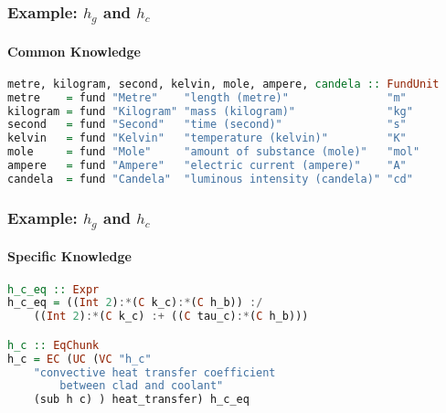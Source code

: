 \documentclass{beamer}
\begin{document}
\begin{frame}[fragile]
\frametitle{Example: $h_g$ and $h_c$}
\framesubtitle{Common Knowledge}


\begin{lstlisting}[language=Haskell, frame=single, showstringspaces=false, basicstyle=\tiny]
metre, kilogram, second, kelvin, mole, ampere, candela :: FundUnit
metre    = fund "Metre"    "length (metre)"               "m"
kilogram = fund "Kilogram" "mass (kilogram)"              "kg"
second   = fund "Second"   "time (second)"                "s"
kelvin   = fund "Kelvin"   "temperature (kelvin)"         "K"
mole     = fund "Mole"     "amount of substance (mole)"   "mol"
ampere   = fund "Ampere"   "electric current (ampere)"    "A"
candela  = fund "Candela"  "luminous intensity (candela)" "cd"
\end{lstlisting}


\end{frame}


\begin{frame}[fragile]

\frametitle{Example: $h_g$ and $h_c$}

\framesubtitle{Specific Knowledge}


\begin{lstlisting}[language=Haskell, frame=single, showstringspaces=false, basicstyle=\small]
h_c_eq :: Expr
h_c_eq = ((Int 2):*(C k_c):*(C h_b)) :/ 
    ((Int 2):*(C k_c) :+ ((C tau_c):*(C h_b)))

h_c :: EqChunk
h_c = EC (UC (VC "h_c" 
    "convective heat transfer coefficient 
        between clad and coolant"
    (sub h c) ) heat_transfer) h_c_eq
\end{lstlisting}


\end{frame}
\end{document}
